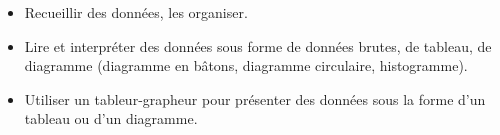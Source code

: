\begin{prerequis}    
    \begin{itemize}        
        \item[\emoji{diamond-suit}] Recueillir des données, les organiser.
        \item[\emoji{diamond-suit}] Lire et interpréter des données sous forme de données brutes, de tableau, de diagramme (diagramme en bâtons, diagramme circulaire, histogramme).
        \item[\emoji{diamond-suit}] Utiliser un tableur-grapheur pour présenter des données sous la forme d’un tableau ou d’un diagramme.
    \end{itemize}
\end{prerequis}